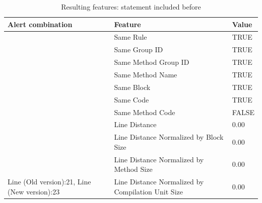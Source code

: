 \documentclass[
]{article}
\begin{document}
\begin{table}[!h]

\caption{\label{tab:unnamed-chunk-10}Resulting features: statement included before \label{include_statement_before} }
\centering
\begin{tabular}[t]{l|l|l}
\hline
Alert combination & Feature & Value\\
\hline
\rowcolor{gray!6}   & Same Rule & TRUE\\

 & Same Group ID & TRUE\\

\rowcolor{gray!6}   & Same Method Group ID & TRUE\\

 & Same Method Name & TRUE\\

\rowcolor{gray!6}   & Same Block & TRUE\\

 & Same Code & TRUE\\

\rowcolor{gray!6}   & Same Method Code & FALSE\\

 & Line Distance & 0.00\\

\rowcolor{gray!6}   & Line Distance Normalized by Block Size & 0.00\\

 & Line Distance Normalized by Method Size & 0.00\\

\multirow[t]{-11}{*}{\raggedright\arraybackslash Line (Old version):21, Line (New version):23} & Line Distance Normalized by Compilation Unit Size & 0.00\\
\hline
\end{tabular}
\end{table}

\normalsize

\newpage
\end{document}

